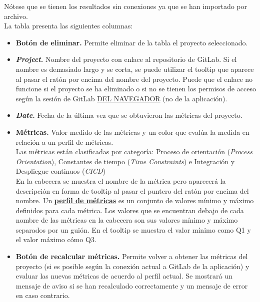 Nótese que se tienen los resultados sin conexiones ya que se han importado por archivo.\\
La tabla presenta las siguientes columnas:
\begin{itemize}
	\item \textbf{Botón de eliminar.} Permite eliminar de la tabla el proyecto seleccionado.
	
	\item \textbf{\textit{Project}.} Nombre del proyecto con enlace al repositorio de GitLab. Si el nombre es demasiado largo y se corta, se puede utilizar el tooltip que aparece al pasar el ratón por encima del nombre del proyecto. Puede que el enlace no funcione si el proyecto se ha eliminado o si no se tienen los permisos de acceso según la sesión de GitLab \underline{DEL NAVEGADOR} (no de la aplicación).
	
	\item \textbf{\textit{Date}.} Fecha de la última vez que se obtuvieron las métricas del proyecto.
	
	\item \textbf{Métricas.} Valor medido de las métricas y un color que evalúa la medida en relación a un perfil de métricas.\\
	Las métricas están clasificadas por categoría: Proceso de orientación (\textit{Process Orientation}), Constantes de tiempo (\textit{Time Constraints}) e Integración y Despliegue continuos (\textit{CICD})\\
	En la cabecera se muestra el nombre de la métrica pero aparecerá la descripción en forma de tooltip al pasar el puntero del ratón por encima del nombre.
	Un \textbf{\underline{perfil de métricas}} es un conjunto de valores mínimo y máximo definidos para cada métrica. Los valores que se encuentran debajo de cada nombre de las métricas en la cabecera son sus valores mínimo y máximo separados por un guión. En el tooltip se muestra el valor mínimo como Q1 y el valor máximo cómo Q3.
	
	\item \textbf{Botón de recalcular métricas.} Permite volver a obtener las métricas del proyecto (si es posible según la conexión actual a GitLab de la aplicación) y evaluar las nuevas métricas de acuerdo al perfil actual. Se mostrará un mensaje de aviso si se han recalculado correctamente y un mensaje de error en caso contrario.
\end{itemize}


